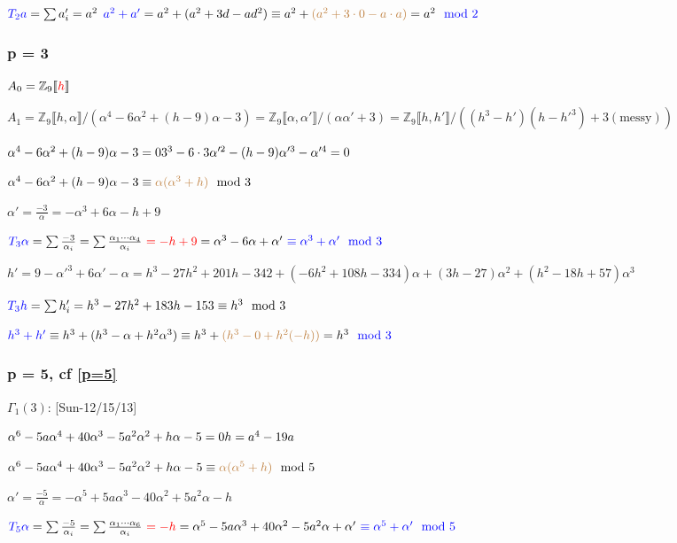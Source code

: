\documentclass{rs}
\theoremstyle{definition}
\theoremstyle{remark}
\newcommand{\mb}[1]{\mathbb{#1}}
\newcommand{\BZ}{{\mb Z}}
\newcommand{\md}{~~{\rm mod}~}
\newcommand{\A}{\alpha}
\newcommand{\G}{\Gamma}
\newcommand{\lb}{\llbracket}
\newcommand{\rb}{\rrbracket}
\numberwithin{equation}{section}
\numberwithin{thm}{section}
\begin{document}
$\textcolor{blue}{T_2 a} = \sum a_i' = a^2$ 
\hfill $\textcolor{blue}{a^2 + a'} = a^2 + (a^2 + 3 d - a d^2) \equiv a^2 + \textcolor{brown}{(a^2 + 3 \cdot 0 - a \cdot a)} = a^2 \textcolor{blue}{\mod 2}$ 


\subsubsection*{p = 3}

$A_0 = \BZ_9 \lb \textcolor{red}{h} \rb$ 

$A_1 = \BZ_9 \lb h, \A \rb / (\A^4 - 6 \A^2 + (h - 9) \A - 3) 
= \BZ_9 \lb \A, \A' \rb / (\A \A' + 3) 
= \BZ_9 \lb h, h' \rb / ((h^3 - h') (h - h'^3) + 3 (\text{messy}))$ 

$\A^4 - 6 \A^2 + (h - 9) \A - 3 = 0 \hfill 3^3 - 6 \cdot 3 \A'^2 - (h - 9) \A'^3 - \A'^4 = 0$ 

$\A^4 - 6 \A^2 + (h - 9) \A - 3 \equiv \textcolor{brown}{\A (\A^3 + h)} \md 3$ 

$\A' = \frac{-3}{\A} = -\A^3 + 6 \A - h + 9$ 

$\textcolor{blue}{T_3 \A} = \sum \frac{-3}{\A_i} = \sum \frac{\A_1 \cdots \A_4}{\A_i} 
~\textcolor{red}{= -h + 9} = \A^3 - 6\A + \A' ~\textcolor{blue}{\equiv \A^3 + \A' \md 3}$ 

$h' = 9 - \A'^3 + 6 \A' - \A = h^3 - 27 h^2 + 201 h - 342 + (-6 h^2 + 108 h - 334) \A + (3 h - 27) \A^2 + (h^2 - 18 h + 57) \A^3$ 

$\textcolor{blue}{T_3 h} = \sum h_i' = h^3 - 27 h^2 + 183 h -153 \equiv h^3 \md 3$ 

\hfill $\textcolor{blue}{h^3 + h'} \equiv h^3 + (h^3 - \A + h^2 \A^3) \equiv h^3 + \textcolor{brown}{(h^3 - 0 + h^2 (-h))} = h^3 \textcolor{blue}{\mod 3}$ 


\subsubsection*{p = 5, cf \eqref{p=5}}

$\G_1(3)$: \hfill [Sun-12/15/13] 

$\A^6 - 5 a \A^4 + 40 \A^3 - 5 a^2 \A^2 + h \A - 5 = 0 \hfill h = a^4 - 19 a$ 

$\A^6 - 5 a \A^4 + 40 \A^3 - 5 a^2 \A^2 + h \A - 5 \equiv \textcolor{brown}{\A (\A^5 + h)} \md 5$ 

$\A' = \frac{-5}{\A} = -\A^5 + 5 a \A^3 - 40 \A^2 + 5 a^2 \A - h$ 

$\textcolor{blue}{T_5 \A} = \sum \frac{-5}{\A_i} = \sum \frac{\A_1 \cdots \A_6}{\A_i} 
~\textcolor{red}{= -h} = \A^5 - 5 a \A^3 + 40 \A^2 - 5 a^2 \A + \A' ~\textcolor{blue}{\equiv \A^5 + \A' \md 5}$ 
\end{document}
